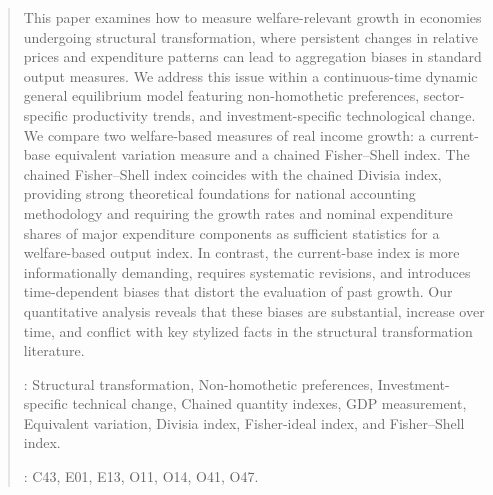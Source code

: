 \documentclass[12pt,a4paper]{article}
\newcommand{\red}[1]{\textcolor{red}{#1}} %
\begin{document}
{\small
\begin{abstract}
\vspace*{-.75em}
{\footnotesize
\noindent 
This paper examines how to measure welfare-relevant growth in economies undergoing structural transformation, where persistent changes in relative prices and expenditure patterns can lead to aggregation biases in standard output measures. We address this issue within a continuous-time dynamic general equilibrium model featuring non-homothetic preferences, sector-specific productivity trends, and investment-specific technological change. We compare two welfare-based measures of real income growth: a current-base equivalent variation measure and a chained Fisher–Shell index. The chained Fisher–Shell index coincides with the chained Divisia index, providing strong theoretical foundations for national accounting methodology and requiring the growth rates and nominal expenditure shares of major expenditure components as sufficient statistics for a welfare-based output index. In contrast, the current-base index is more informationally demanding, requires systematic revisions, and introduces time-dependent biases that distort the evaluation of past growth. Our quantitative analysis reveals that these biases are substantial, increase over time, and conflict with key stylized facts in the structural transformation literature.

\medskip{}: Structural transformation, Non-homothetic preferences, Investment-specific technical change, Chained quantity indexes, GDP measurement, Equivalent variation, Divisia index, Fisher-ideal index, and Fisher–Shell index.

\medskip{}: C43, E01, E13, O11, O14,  O41, O47.
}
\end{abstract}
}
\thispagestyle{empty}
\end{document}
